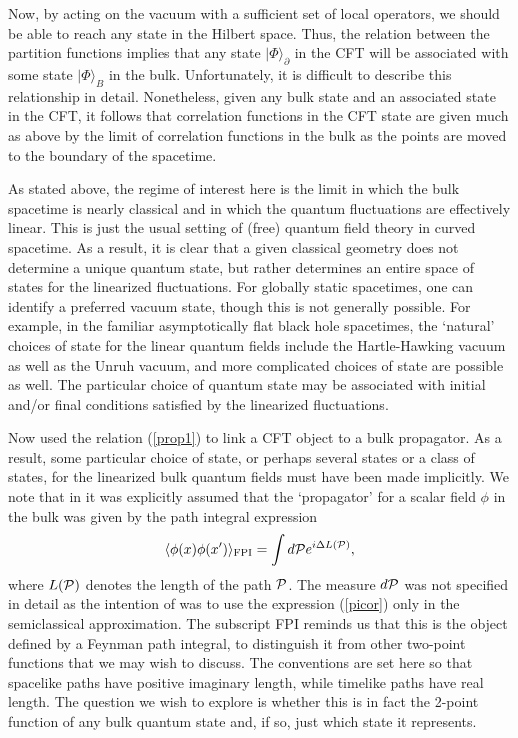 \documentclass[a4paper,12pt]{article}
\begin{document}
Now, by acting on the vacuum with a sufficient set of local operators,
we should be able to reach any state in the Hilbert space.  Thus, the
relation between the partition functions implies that any state
$|\Phi\rangle_\partial$ in the CFT will be associated with some state
$|\Phi\rangle_B$ in the bulk.  Unfortunately,  it is
difficult to describe this relationship in detail.  Nonetheless, given
any bulk state and an associated state in the CFT, it follows that
correlation functions in the CFT state are given much as above by the
limit of correlation functions in the bulk as the points are moved to
the boundary of the spacetime.

As stated above, the regime of interest here is the limit in which the
bulk spacetime is nearly classical and in which the quantum
fluctuations are effectively linear.  This is just the usual setting
of (free) quantum field theory in curved spacetime.  As a result, it
is clear that a given classical geometry does not determine a unique
quantum state, but rather determines an entire space of states for the
linearized fluctuations.  For globally static spacetimes, one can
identify a preferred vacuum state, though this is not generally
possible.  For example, in the familiar asymptotically flat black hole
spacetimes, the `natural' choices of state for the linear quantum
fields include the Hartle-Hawking vacuum as well as the Unruh vacuum,
and more complicated choices of state are possible as well.  The
particular choice of quantum state may be associated with initial
and/or final conditions satisfied by the linearized fluctuations.

Now \cite{holopart} used the relation (\ref{prop1}) to link a CFT
object to a bulk propagator.  As a result, some particular choice of
state, or perhaps several states or a class of states, for the
linearized bulk quantum fields must have been made implicitly.  We
note that in \cite{holopart} it was explicitly assumed that the
`propagator' for a scalar field $\phi$ in the bulk was given by the
path integral expression
\begin{equation}  
\label{picor}
\langle \phi (x) \phi(x') \rangle_{\rm FPI} = \int d{\cal P} e^{i
\Delta L({\cal P})},
\end{equation}
where $L({\cal P})$ denotes the length of the path ${\cal P}$.  
The measure $d{\cal P}$ was not specified in detail as
the intention of \cite{holopart} was to use the expression
(\ref{picor}) only in the semiclassical approximation.  The
subscript FPI reminds us that this is the object defined by a Feynman
path integral, to distinguish it from other two-point functions that
we may wish to discuss.  The conventions are set here so that
spacelike paths have positive imaginary length, while timelike paths
have real length.  The question we wish to explore is whether this is
in fact the 2-point function of any bulk quantum state and, if so,
just which state it represents.
\end{document}
